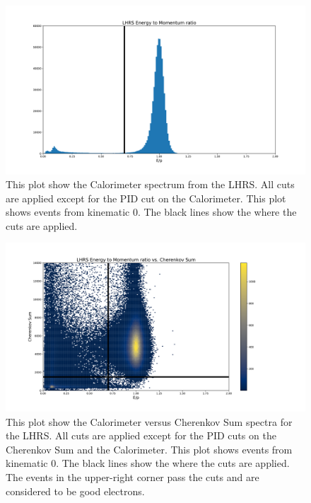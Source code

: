 \begin{figure}
\begin{center}
	\includegraphics[width=\textwidth]{./analysis/fig/LCal_pid.pdf}
	\caption{This plot show the Calorimeter spectrum from the LHRS. All cuts are applied except for the PID cut on the Calorimeter. This plot shows events from kinematic 0. The black lines show the where the cuts are applied.}
	\label{fig:cal_pid}
\end{center}
\end{figure}

\begin{figure}
\begin{center}
	\includegraphics[width=\textwidth]{./analysis/fig/LCervCal_pid.pdf}
	\caption{This plot show the Calorimeter versus Cherenkov Sum spectra for the LHRS. All cuts are applied except for the PID cuts on the Cherenkov Sum and the Calorimeter. This plot shows events from kinematic 0. The black lines show the where the cuts are applied. The events in the upper-right corner pass the cuts and are considered to be good electrons.}
	\label{fig:cervcal_pid}
\end{center}
\end{figure}


